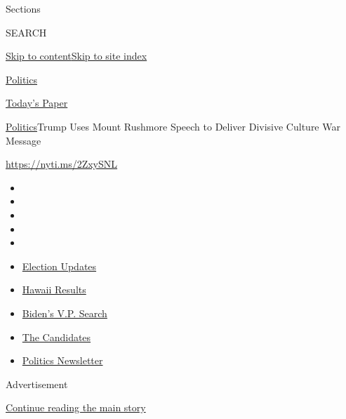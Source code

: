 Sections

SEARCH

\protect\hyperlink{site-content}{Skip to
content}\protect\hyperlink{site-index}{Skip to site index}

\href{https://www.nytimes.com/section/politics}{Politics}

\href{https://myaccount.nytimes.com/auth/login?response_type=cookie\&client_id=vi}{}

\href{https://www.nytimes.com/section/todayspaper}{Today's Paper}

\href{/section/politics}{Politics}\textbar{}Trump Uses Mount Rushmore
Speech to Deliver Divisive Culture War Message

\href{https://nyti.ms/2ZxySNL}{https://nyti.ms/2ZxySNL}

\begin{itemize}
\item
\item
\item
\item
\item
\end{itemize}

\begin{itemize}
\item
  \href{https://www.nytimes.com/2020/08/07/us/elections/biden-vs-trump.html?action=click\&pgtype=Article\&state=default\&region=TOP_BANNER\&context=storylines_menu}{Election
  Updates}
\item
  \href{https://www.nytimes.com/interactive/2020/08/08/us/elections/results-hawaii-primary-elections.html?action=click\&pgtype=Article\&state=default\&region=TOP_BANNER\&context=storylines_menu}{Hawaii
  Results}
\item
  \href{https://www.nytimes.com/article/biden-vice-president-2020.html?action=click\&pgtype=Article\&state=default\&region=TOP_BANNER\&context=storylines_menu}{Biden's
  V.P. Search}
\item
  \href{https://www.nytimes.com/interactive/2019/us/politics/2020-presidential-candidates.html?action=click\&pgtype=Article\&state=default\&region=TOP_BANNER\&context=storylines_menu}{The
  Candidates}
\item
  \href{https://www.nytimes.com/newsletters/politics?action=click\&pgtype=Article\&state=default\&region=TOP_BANNER\&context=storylines_menu}{Politics
  Newsletter}
\end{itemize}

Advertisement

\protect\hyperlink{after-top}{Continue reading the main story}

